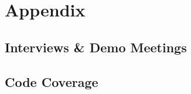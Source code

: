 \cleardoublepage
{}
\part*{Appendix}
\chapter{Interviews \& Demo Meetings}
\label{app:interview}

\newpage{}

\newpage{}

\newpage{}

\newpage{}

\pagebreak{}

\newpage{}

\newpage{}


\chapter{Code Coverage}





